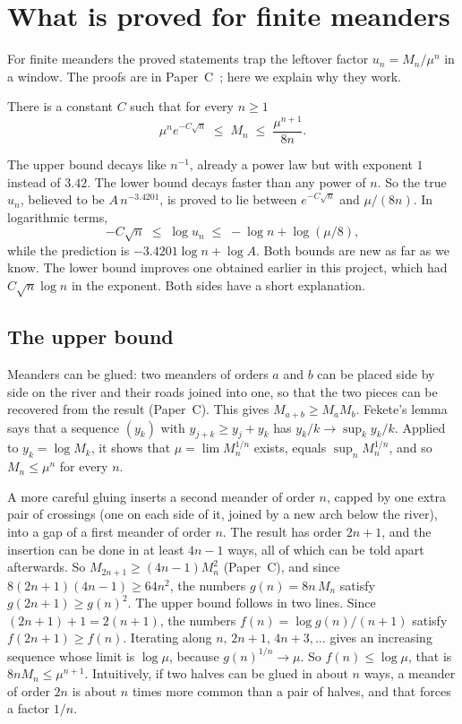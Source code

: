 \section{What is proved for finite meanders}\label{sec:proved}

For finite meanders the proved statements trap the leftover factor $u_n=M_n/\mu^n$ in a window.
The proofs are in Paper~C~\cite{PaperC}; here we explain why they work.

\begin{theorem}\label{thm:sqrt}
There is a constant $C$ such that for every $n\ge1$
\[ \mu^n e^{-C\sqrt n} \;\le\; M_n \;\le\; \frac{\mu^{n+1}}{8n} . \]
\end{theorem}

The upper bound decays like $n^{-1}$, already a power law but with exponent $1$ instead of
$3.42$. The lower bound decays faster than any power of $n$. So the true $u_n$, believed to be
$A\,n^{-3.4201}$, is proved to lie between $e^{-C\sqrt n}$ and $\mu/(8n)$. In logarithmic terms,
\[ -C\sqrt n \;\le\; \log u_n \;\le\; -\log n + \log(\mu/8),\]
while the prediction is $-3.4201\log n+\log A$. Both bounds are new as far as we know. The
lower bound improves one obtained earlier in this project, which had $C\sqrt n\log n$ in the
exponent. Both sides have a short explanation.

\subsection{The upper bound}\label{sec:upperA}

Meanders can be glued: two meanders of orders $a$ and $b$ can be placed side by side on the
river and their roads joined into one, so that the two pieces can be recovered from the result
(Paper~C). This gives $M_{a+b}\ge M_aM_b$. Fekete's lemma says that a sequence $(y_k)$ with
$y_{j+k}\ge y_j+y_k$ has $y_k/k\to\sup_k y_k/k$. Applied to $y_k=\log M_k$, it shows that
$\mu=\lim M_n^{1/n}$ exists, equals $\sup_n M_n^{1/n}$, and so $M_n\le\mu^n$ for every $n$.

A more careful gluing inserts a second meander of order $n$, capped by one extra pair of
crossings (one on each side of it, joined by a new arch below the river), into a gap of a first
meander of order $n$. The result has order $2n+1$, and the insertion can be done in at least
$4n-1$ ways, all of which can be told apart afterwards. So $M_{2n+1}\ge(4n-1)M_n^2$ (Paper~C), and
since $8(2n+1)(4n-1)\ge64n^2$, the numbers $g(n)=8n\,M_n$ satisfy $g(2n+1)\ge g(n)^2$. The upper
bound follows in two lines. Since $(2n+1)+1=2(n+1)$, the numbers $f(n)=\log g(n)/(n+1)$ satisfy
$f(2n+1)\ge f(n)$.
Iterating along $n,\,2n+1,\,4n+3,\ldots$ gives an increasing sequence whose limit is $\log\mu$,
because $g(n)^{1/n}\to\mu$. So $f(n)\le\log\mu$, that is $8nM_n\le\mu^{n+1}$. Intuitively, if
two halves can be glued in about $n$ ways, a meander of order $2n$ is about $n$ times more common
than a pair of halves, and that forces a factor $1/n$.

